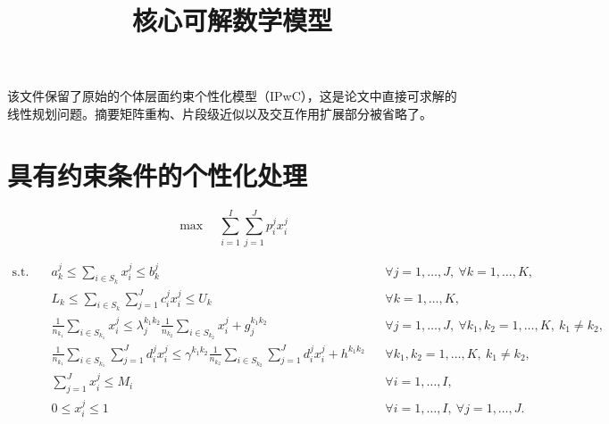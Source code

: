 \documentclass{article}
\title{核心可解数学模型}
\author{}
\date{}
\begin{document}
\maketitle

该文件保留了原始的个体层面约束个性化模型（IPwC），这是论文中直接可求解的线性规划问题。摘要矩阵重构、片段级近似以及交互作用扩展部分被省略了。

\section{具有约束条件的个性化处理}

\begin{equation}
\max \quad \sum_{i=1}^{I} \sum_{j=1}^{J} p_i^j x_i^j
\tag{1}
\end{equation}

\begin{equation}
\begin{aligned}
\text{s.t.}\quad
& a_k^j \le \sum_{i\in S_k} x_i^j \le b_k^j
&& \forall j=1,\dots,J,\ \forall k=1,\dots,K, \\
& L_k \le \sum_{i\in S_k} \sum_{j=1}^{J} c_i^j x_i^j \le U_k
&& \forall k=1,\dots,K, \\
& \frac{1}{n_{k_1}} \sum_{i\in S_{k_1}} x_i^j
\le
\lambda_j^{k_1 k_2}\frac{1}{n_{k_2}} \sum_{i\in S_{k_2}} x_i^j + g_j^{k_1 k_2}
&& \forall j=1,\dots,J,\ \forall k_1,k_2=1,\dots,K,\ k_1\ne k_2, \\
& \frac{1}{n_{k_1}} \sum_{i\in S_{k_1}} \sum_{j=1}^{J} d_i^j x_i^j
\le
\gamma^{k_1 k_2}\frac{1}{n_{k_2}} \sum_{i\in S_{k_2}} \sum_{j=1}^{J} d_i^j x_i^j + h^{k_1 k_2}
&& \forall k_1,k_2=1,\dots,K,\ k_1\ne k_2, \\
& \sum_{j=1}^{J} x_i^j \le M_i
&& \forall i=1,\dots,I, \\
& 0 \le x_i^j \le 1
&& \forall i=1,\dots,I,\ \forall j=1,\dots,J.
\end{aligned}
\end{equation}
\end{document}

